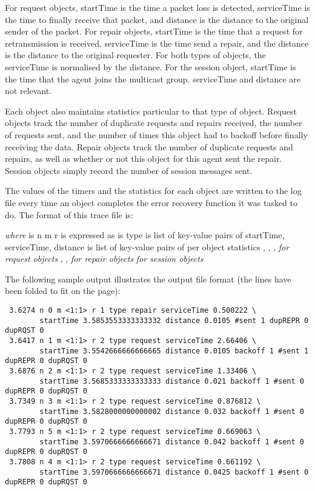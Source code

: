 For request objects, startTime is the time a packet loss is detected,
serviceTime is the time to finally receive that packet,
and distance is the distance to the original sender of the packet.
For repair objects, startTime is the time that a request for
retransmission is received, serviceTime is the time send a repair,
and the distance is the distance to the original requester.
For both types of objects, the serviceTime is normalised by the
distance.
For  the session object,
startTime is the time that the agent joins the multicast group.
serviceTime and distance are not relevant.

Each object also maintains statistics particular to that type of object.
Request objects track the number of duplicate requests and repairs received,
the number of requests sent, and the number of times this object
had to backoff before finally receiving the data.
Repair objects track the number of duplicate requests and repairs,
as well as whether or not this object for this agent sent the repair.
Session objects simply record the number of session messages sent.

The values of the timers and the statistics for each object are written
to the log file every time an object completes the error recovery function
it was tasked to do.
The format of this trace file is:
\begin{program}
                   
{\itshape{}where}
 is          n  m  r 
                 is expressed as 
 is             type 
 is          list of key-value pairs of startTime, serviceTime, distance
 is          list of key-value pairs of per object statistics
                , , ,              {\itshape for request objects}
                , ,                       {\itshape for repair objects}
                                                        {\itshape for session objects}
\end{program}
The following sample output illustrates the output file format (the lines
have been folded to fit on the page):
{\small
\begin{verbatim}
 3.6274 n 0 m <1:1> r 1 type repair serviceTime 0.500222 \
        startTime 3.5853553333333332 distance 0.0105 #sent 1 dupREPR 0 dupRQST 0
 3.6417 n 1 m <1:1> r 2 type request serviceTime 2.66406 \
        startTime 3.5542666666666665 distance 0.0105 backoff 1 #sent 1 dupREPR 0 dupRQST 0
 3.6876 n 2 m <1:1> r 2 type request serviceTime 1.33406 \
        startTime 3.5685333333333333 distance 0.021 backoff 1 #sent 0 dupREPR 0 dupRQST 0
 3.7349 n 3 m <1:1> r 2 type request serviceTime 0.876812 \
        startTime 3.5828000000000002 distance 0.032 backoff 1 #sent 0 dupREPR 0 dupRQST 0
 3.7793 n 5 m <1:1> r 2 type request serviceTime 0.669063 \
        startTime 3.5970666666666671 distance 0.042 backoff 1 #sent 0 dupREPR 0 dupRQST 0
 3.7808 n 4 m <1:1> r 2 type request serviceTime 0.661192 \
        startTime 3.5970666666666671 distance 0.0425 backoff 1 #sent 0 dupREPR 0 dupRQST 0
\end{verbatim}
}

